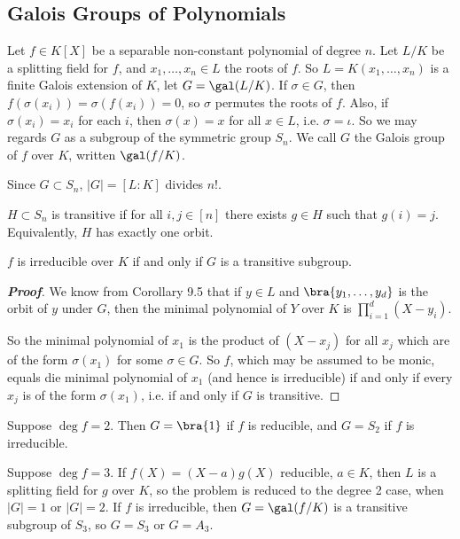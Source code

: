 \subsection{Galois Groups of Polynomials}

Let $f \in K[X]$ be a separable non-constant polynomial of degree $n$. Let $L/K$ be a splitting field for $f$, and $x_1, \dots , x_n \in L$ the roots of $f$. So $L = K(x_1, \dots , x_n)$ is a finite Galois extension of $K$, let $G = \gal(L/K)$. If $\sigma \in G$, then $f(\sigma(x_i)) = \sigma(f(x_i)) = 0$, so $\sigma$ permutes the roots of $f$. Also, if $\sigma(x_i) = x_i$ for each $i$, then $\sigma(x) = x$ for all $x \in L$, i.e. $\sigma = \iota$. So we may regards $G$ as a subgroup of the symmetric group $S_n$. We call $G$ the Galois group of $f$ over $K$, written $\gal(f/K)$.

Since $G \subset S_n$, $|G| = [L : K]$ divides $n!$.

\begin{definition}
$H \subset S_n$ is transitive if for all $i, j \in [n]$ there exists $g \in H$ such that $g(i) = j$. Equivalently, $H$ has exactly one orbit.
\end{definition}

\begin{proposition}
$f$ is irreducible over $K$ if and only if $G$ is a transitive subgroup.
\end{proposition}

\begin{proof}[\bf Proof]
We know from Corollary 9.5 that if $y \in L$ and $\bra{y_1, \dots , y_d}$ is the orbit of $y$ under $G$, then the minimal polynomial of $Y$ over $K$ is
$\prod^d_{i=1}(X - y_i)$.

So the minimal polynomial of $x_1$ is the product of $(X - x_j)$ for all $x_j$ which are of the form $\sigma(x_1)$ for some $\sigma \in G$. So $f$, which may be assumed to be monic, equals die minimal polynomial of $x_1$ (and hence is irreducible) if and only if every $x_j$ is of the form $\sigma(x_1)$, i.e. if and only if $G$ is transitive.
\end{proof}

Suppose $\deg f = 2$. Then $G = \bra{1}$ if $f$ is reducible, and $G = S_2$ if $f$ is irreducible.

Suppose $\deg f = 3$. If $f(X) = (X - a)g(X)$ reducible, $a \in K$, then $L$ is a splitting field for $g$ over $K$, so the problem is reduced to the degree 2 case, when $|G| = 1$ or $|G| = 2$. If $f$ is irreducible, then $G = \gal(f/K)$ is a transitive subgroup of $S_3$, so $G = S_3$ or $G = A_3$.

